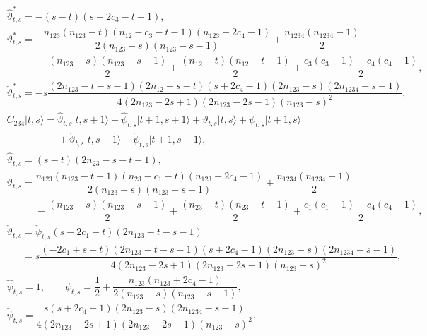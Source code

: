 \documentclass[10pt,a4paper]{amsart}
\numberwithin{equation}{section}
\begin{document}
\begin{gather*}
\hat{\vartheta}^*_{t,s}=-(s-t)(s-2c_3-t+1),\\
\vartheta^*_{t,s}=-\dfrac{n_{123}(n_{123}-t)(n_{12}-c_3-t-1)(n_{123}+2c_4-1)}{2(n_{123}-s)(n_{123}-s-1)}+\dfrac{n_{1234}(n_{1234}-1)}{2}\\
\phantom{\vartheta^*_{t,s}=}{}-\dfrac{(n_{123}-s)(n_{123}-s-1)}{2}+\dfrac{(n_{12}-t)(n_{12}-t-1)}{2}+\dfrac{c_3(c_3-1)+c_4(c_4-1)}{2},\\
\check{\vartheta}^*_{t,s}=-s\dfrac{(2n_{123}-t-s-1)(2n_{12}-s-t)(s+2c_4-1)(2n_{123}-s)(2n_{1234}-s-1)}{4(2n_{123}-2s+1)(2n_{123}-2s-1)(n_{123}-s)^2},
\\
C_{234}\vert t,s\rangle =\hat{\vartheta}_{t,s}\vert t,s+1\rangle+\hat{\psi}_{t,s}\vert t+1,s+1\rangle
  +\vartheta_{t,s}\vert t,s\rangle+\psi_{t,s}\vert t+1,s\rangle
\\
  \phantom{C_{234}\vert t,s\rangle =}{} +\check{\vartheta}_{t,s}\vert t,s-1\rangle+\check{\psi}_{t,s}\vert t+1,s-1\rangle,\\
  \hat{\vartheta}_{t,s}=(s-t)(2n_{23}-s-t-1),\\
  \vartheta_{t,s}=\dfrac{n_{123}(n_{123}-t-1)(n_{23}-c_1-t)(n_{123}+2c_4-1)}{2(n_{123}-s)(n_{123}-s-1)}+\dfrac{n_{1234}(n_{1234}-1)}{2}\\
\phantom{\vartheta_{t,s}=}{}-\dfrac{(n_{123}-s)(n_{123}-s-1)}{2}+\dfrac{(n_{23}-t)(n_{23}-t-1)}{2}+\dfrac{c_1(c_1-1)+c_4(c_4-1)}{2},\\
  \check{\vartheta}_{t,s}=\check{\psi}_{t,s}(s-2c_1-t)(2n_{123}-t-s-1)\\
  \phantom{  \check{\vartheta}_{t,s}}{}=s\dfrac{(-2c_1+s-t)(2n_{123}-t-s-1)(s+2c_4-1)(2n_{123}-s)(2n_{1234}-s-1)}{4(2n_{123}-2s+1)(2n_{123}-2s-1)(n_{123}-s)^2},\\
  \hat{\psi}_{t,s}=1,\qquad
  \psi_{t,s}=\dfrac{1}{2}+\dfrac{n_{123}(n_{123}+2c_4-1)}{2(n_{123}-s)(n_{123}-s-1)},\\
  \check{\psi}_{t,s}=\dfrac{s(s+2c_4-1)(2n_{123}-s)(2n_{1234}-s-1)}{4(2n_{123}-2s+1)(2n_{123}-2s-1)(n_{123}-s)^2}.
\end{gather*}
\end{document}
